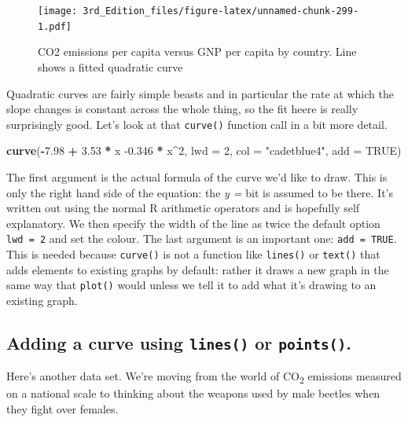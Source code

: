 \documentclass[
]{book}
\newenvironment{Shaded}{\begin{snugshade}}{\end{snugshade}}
\newcommand{\DataTypeTok}[1]{\textcolor[rgb]{0.13,0.29,0.53}{#1}}
\newcommand{\DecValTok}[1]{\textcolor[rgb]{0.00,0.00,0.81}{#1}}
\newcommand{\FloatTok}[1]{\textcolor[rgb]{0.00,0.00,0.81}{#1}}
\newcommand{\KeywordTok}[1]{\textcolor[rgb]{0.13,0.29,0.53}{\textbf{#1}}}
\newcommand{\NormalTok}[1]{#1}
\newcommand{\OperatorTok}[1]{\textcolor[rgb]{0.81,0.36,0.00}{\textbf{#1}}}
\newcommand{\OtherTok}[1]{\textcolor[rgb]{0.56,0.35,0.01}{#1}}
\newcommand{\StringTok}[1]{\textcolor[rgb]{0.31,0.60,0.02}{#1}}
\begin{document}
\begin{figure}
\centering
\texttt{[image: 3rd\_Edition\_files/figure-latex/unnamed-chunk-299-1.pdf]}
\caption{\label{fig:unnamed-chunk-299}CO2 emissions per capita versus GNP per capita by country. Line shows a fitted quadratic curve}
\end{figure}

Quadratic curves are fairly simple beasts and in particular the rate at which the slope changes is constant across the whole thing, so the fit heere is really surprisingly good. Let's look at that \texttt{curve()} function call in a bit more detail.

\begin{Shaded}
\begin{Highlighting}[]
\KeywordTok{curve}\NormalTok{(}\OperatorTok{-}\FloatTok{7.98} \OperatorTok{+}\StringTok{ }\FloatTok{3.53} \OperatorTok{*}\StringTok{ }\NormalTok{x }\FloatTok{-0.346} \OperatorTok{*}\StringTok{ }\NormalTok{x}\OperatorTok{^}\DecValTok{2}\NormalTok{,}
      \DataTypeTok{lwd =} \DecValTok{2}\NormalTok{,}
      \DataTypeTok{col =} \StringTok{"cadetblue4"}\NormalTok{,}
      \DataTypeTok{add =} \OtherTok{TRUE}\NormalTok{)}
\end{Highlighting}
\end{Shaded}

The first argument is the actual formula of the curve we'd like to draw. This is only the right hand side of the equation: the \emph{y = } bit is assumed to be there. It's written out using the normal R arithmetic operators and is hopefully self explanatory. We then specify the width of the line as twice the default option \texttt{lwd\ =\ 2} and set the colour. The last argument is an important one: \texttt{add\ =\ TRUE}. This is needed because \texttt{curve()} is not a function like \texttt{lines()} or \texttt{text()} that adds elements to existing graphs by default: rather it draws a new graph in the same way that \texttt{plot()} would unless we tell it to add what it's drawing to an existing graph.

\hypertarget{adding-a-curve-using-lines-or-points.}{%
\subsection{\texorpdfstring{Adding a curve using \texttt{lines()} or \texttt{points()}.}{Adding a curve using lines() or points().}}\label{adding-a-curve-using-lines-or-points.}}

Here's another data set. We're moving from the world of CO\textsubscript{2} emissions measured on a national scale to thinking about the weapons used by male beetles when they fight over females.
\end{document}
